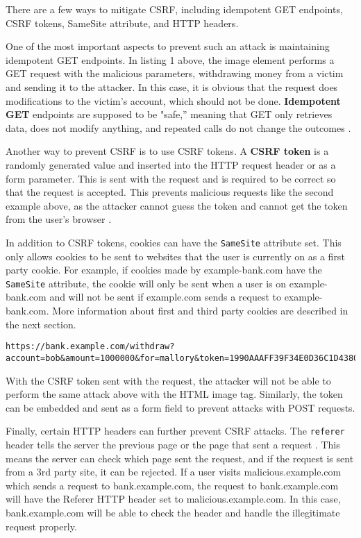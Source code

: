 \documentclass[conference,12pt]{IEEEtran}
\begin{document}
There are a few ways to mitigate CSRF, including idempotent GET endpoints, CSRF
tokens, SameSite attribute, and HTTP headers.  

One of the most important aspects to prevent such an attack is maintaining
idempotent GET endpoints.  In listing 1 above, the image element performs a GET
request with the malicious parameters, withdrawing money from a victim and
sending it to the attacker.  In this case, it is obvious that the request does
modifications to the victim’s account, which should not be done.
\textbf{Idempotent GET} endpoints are supposed to be "safe,” meaning that GET
only retrieves data, does not modify anything, and repeated calls do not change
the outcomes \cite{b9}.

Another way to prevent CSRF is to use CSRF tokens.  A \textbf{CSRF token} is a
randomly generated value and inserted into the HTTP request header or as a form
parameter.  This is sent with the request and is required to be correct so that
the request is accepted.  This prevents malicious requests like the second
example above, as the attacker cannot guess the token and cannot get the token
from the user’s browser \cite{b10}.

In addition to CSRF tokens, cookies can have the \lstinline{SameSite} attribute
set.  This only allows cookies to be sent to websites that the user is currently
on as a first party cookie.  For example, if cookies made by example-bank.com
have the \lstinline{SameSite} attribute, the cookie will only be sent when a
user is on example-bank.com and will not be sent if example.com sends a request
to example-bank.com.  More information about first and third party cookies are
described in the next section.

\begin{lstlisting}[caption={CSRF token with a GET request}]
https://bank.example.com/withdraw?account=bob&amount=1000000&for=mallory&token=1990AAAFF39F34E0D36C1D4380657AD5
\end{lstlisting}

With the CSRF token sent with the request, the attacker will not be able to
perform the same attack above with the HTML image tag.  Similarly, the token can
be embedded and sent as a form field to prevent attacks with POST requests.

Finally, certain HTTP headers can further prevent CSRF attacks. The
\lstinline{referer} header tells the server the previous page or the page that
sent a request \cite{b11}.  This means the server can check which page sent the
request, and if the request is sent from a 3rd party site, it can be rejected.
If a user visits malicious.example.com which sends a request to
bank.example.com, the request to bank.example.com will have the Referer HTTP
header set to malicious.example.com.  In this case, bank.example.com will be
able to check the header and handle the illegitimate request properly.
\end{document}

